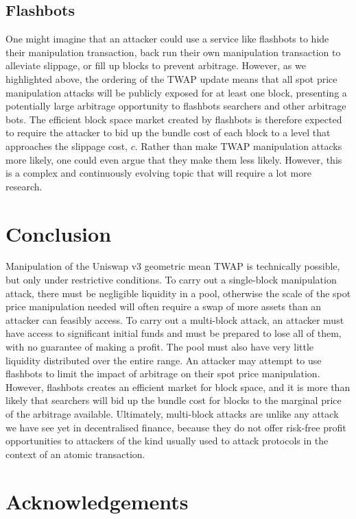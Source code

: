 \documentclass[a4paper, 11pt]{article}
\begin{document}
\subsection{Flashbots}

One might imagine that an attacker could use a service like flashbots to hide their manipulation transaction, back run their own manipulation transaction to alleviate slippage, or fill up blocks to prevent arbitrage. However, as we highlighted above, the ordering of the TWAP update means that all spot price manipulation attacks will be publicly exposed for at least one block, presenting a potentially large arbitrage opportunity to flashbots searchers and other arbitrage bots. The efficient block space market created by flashbots is therefore expected to require the attacker to bid up the bundle cost of each block to a level that approaches the slippage cost, $c$. Rather than make TWAP manipulation attacks more likely, one could even argue that they make them less likely. However, this is a complex and continuously evolving topic that will require a lot more research.

\section{Conclusion}

Manipulation of the Uniswap v3 geometric mean TWAP is technically possible, but only under restrictive conditions. To carry out a single-block manipulation attack, there must be negligible liquidity in a pool, otherwise the scale of the spot price manipulation needed will often require a swap of more assets than an attacker can feasibly access. To carry out a multi-block attack, an attacker must have access to significant initial funds and must be prepared to lose all of them, with no guarantee of making a profit. The pool must also have very little liquidity distributed over the entire range. An attacker may attempt to use flashbots to limit the impact of arbitrage on their spot price manipulation. However, flashbots creates an efficient market for block space, and it is more than likely that searchers will bid up the bundle cost for blocks to the marginal price of the arbitrage available. Ultimately, multi-block attacks are unlike any attack we have see yet in decentralised finance, because they do not offer risk-free profit opportunities to attackers of the kind usually used to attack protocols in the context of an atomic transaction. 

\section{Acknowledgements}
\end{document}

